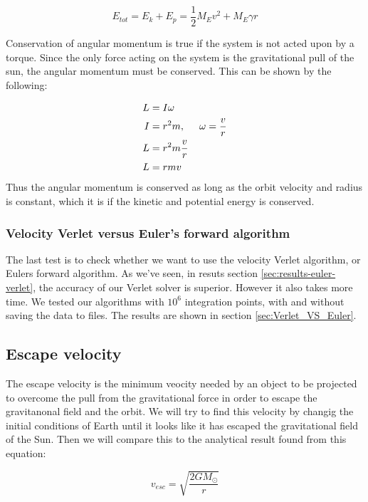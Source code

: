 \documentclass[../main.tex]{subfiles}
\begin{document}
$$E_{tot} = E_k + E_p = \frac{1}{2} M_E v^2 + M_E \gamma r$$

Conservation of angular momentum is true if the system is not acted upon by a torque. Since the only force acting on the system is the gravitational pull of the sun, the angular momentum must be conserved. This can be shown by the following:

\begin{align*}
  L &= I \omega \\
  I &= r^2m, \hspace{5mm} \omega = \frac{v}{r} \\
  L &= r^2m \frac{v}{r} \\
  L &= rmv
\end{align*}
Thus the angular momentum is conserved as long as the orbit velocity and radius is constant, which it is if the kinetic and potential energy is conserved.

\subsubsection{Velocity Verlet versus Euler's forward algorithm}
The last test is to check whether we want to use the velocity Verlet algorithm, or Eulers forward algorithm. As we've seen, in resuts section \ref{sec:results-euler-verlet}, the accuracy of our Verlet solver is superior. However it also takes more time. We tested our algorithms with $10^6$ integration points, with and without saving the data to files. The results are shown in section \ref{sec:Verlet_VS_Euler}.

\subsection{Escape velocity}\label{sec:theory-EscapeVelocity}
The escape velocity is the minimum veocity needed by an object to be projected to overcome the pull from the gravitational force in order to escape the gravitanonal field and the orbit. We will try to find this velocity by changig the initial conditions of Earth until it looks like it has escaped the gravitational field of the Sun. Then we will compare this to the analytical result found from this equation:

\begin{equation}\label{eq:escapevelocity}
  v_{esc} = \sqrt{\frac{2GM_\odot}{r}}
\end{equation}
\end{document}
